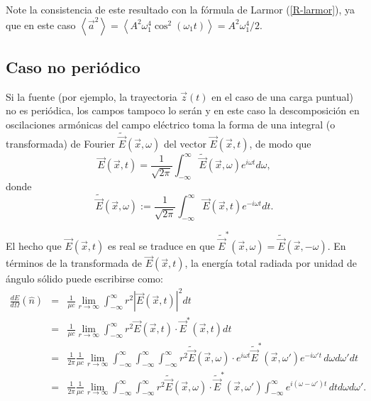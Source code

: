 Note la consistencia de este resultado con la fórmula de Larmor (\ref{R-larmor}), ya que en este caso $\left\langle\vec{a}^2\right\rangle=\left\langle A^2\omega_1^4\cos^2(\omega_1t)\right\rangle=A^2\omega_1^4/2$.


\subsection{Caso no periódico}

Si la fuente (por ejemplo, la trayectoria $\vec{z}(t)$ en el caso de una carga puntual) no es periódica, los campos tampoco lo serán y en este caso la descomposición en oscilaciones armónicas del campo eléctrico toma la forma de una integral (o transformada) de Fourier $\tilde{\vec{E}}(\vec{x},\omega)$ del vector $\vec{E}(\vec{x},t)$, de modo que
\begin{equation}
 \vec{E}(\vec{x},t)=\frac{1}{\sqrt{2\pi}}\int_{-\infty}^{\infty}\tilde{\vec{E}}(\vec{x},\omega) e^{i\omega t}d\omega ,
\end{equation}
donde
\begin{equation}
\tilde{\vec{E}}(\vec{x},\omega) :=\frac{1}{\sqrt{2\pi}}\int_{-\infty}^{\infty}\vec{E}(\vec{x},t) e^{-i\omega t}dt .  \label{dp3}
\end{equation}

El hecho que $\vec{E}(\vec{x},t)$ es real se traduce en que 
$\tilde{\vec{E}}^*(\vec{x},\omega)=\tilde{\vec{E}}(\vec{x},-\omega)$. En términos de la transformada de $\vec{E}(\vec{x},t)$, la energía total radiada por unidad de ángulo sólido puede escribirse como:
\begin{eqnarray}
\frac{dE}{d\Omega}(\hat{n}) &=&\frac{1}{\mu c}\lim_{r\to\infty} \int_{-\infty}^{\infty}r^2\left|\vec{E}(\vec{x},t)
\right|^2dt \label{dEdO0}\\
&=&\frac{1}{\mu c}\lim_{r\to\infty}\int_{-\infty}^{\infty}r^2\vec{E}(\vec{x},t)\cdot \vec{E}^*(\vec{x},t)dt\\
&=&\frac{1}{2\pi}\frac{1}{\mu c}\lim_{r\to\infty}\int_{-\infty}^{\infty}\int_{-\infty}^{\infty}\int_{-\infty}^{
\infty}r^2\tilde{\vec{E}}(\vec{x},\omega) \cdot e^{i\omega t}\tilde{\vec{E}}^\ast(\vec{x},\omega')e^{-i\omega' t}\,d\omega d\omega' dt\\
&=&\frac{1}{2\pi}\frac{1}{\mu c}\lim_{r\to\infty} \int_{-\infty}^{\infty}\int_{-\infty}^{\infty}r^2\tilde{\vec{E}}(\vec{x},\omega)\cdot \tilde{\vec{E}}^*(\vec{x},\omega')\int_{-\infty}^{\infty} e^{i(\omega-\omega')t}\,dtd\omega d\omega' .
\end{eqnarray}

